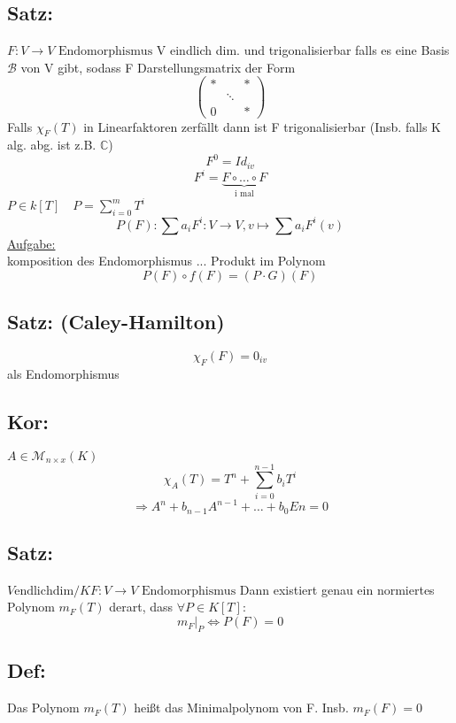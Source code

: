 \documentclass[titlepage,12pt,a4paper,ngerman]{report}
\newcommand{\tx}[1]{\textrm{#1}}
\newcommand{\enph}{F: V \to V \textrm{ Endomorphismus}}
\begin{document}




\subsection{Satz:}
$\enph$ V eindlich dim. und trigonalisierbar
falls es eine Basis $\mathcal{B}$ von V gibt, sodass F Darstellungsmatrix der Form
$$\begin{pmatrix}
* && * \\
& \ddots \\
0 && *
\end{pmatrix}$$
Falls $\chi_F(T)$ in Linearfaktoren zerfällt dann ist F trigonalisierbar (Insb. falls K alg. abg. ist z.B. $ \mathbb{C}$)
$$F^0 = Id_{iv}$$
$$ F^i = \underbrace{F \circ \dots \circ F}_{\tx{i mal}}$$
$P\in k[T] \quad P = \sum_{i=0}^mT^i$
$$P(F): \sum a_i F^i: V\to V, v \mapsto \sum a_i F^i(v)$$
\underline{Aufgabe:}\\
komposition des Endomorphismus ... Produkt im Polynom
$$P(F) \circ f(F) = (P \cdot G)(F)$$

\subsection{Satz: (Caley-Hamilton)}
$$\chi_F(F) = 0_{iv} $$
als Endomorphismus
\subsection{Kor:} $A\in \mathcal{M}_{n\times x} (K)$
$$\chi_A(T) = T^n + \sum_{i=0}^{n-1} b_i T^i$$
$$\Rightarrow A^n + b_{n-1} A^{n-1} + \dots  + b_0 En = 0$$
\subsection{Satz:}
$ V \tx{endlichdim} / K \enph$
Dann existiert genau ein normiertes Polynom $m_F(T)$ derart, dass $\forall P\in K[T]$:
$$ m_F|_P \Leftrightarrow P(F) = 0$$
\subsection{Def:}
Das Polynom $m_F(T)$ heißt das Minimalpolynom von F. Insb. $m_F(F) = 0$
\end{document}
